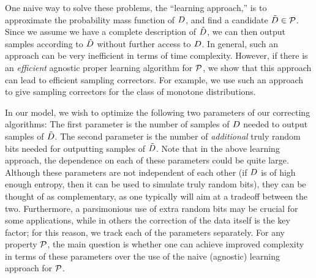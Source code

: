 One naive way to solve these problems, the ``learning approach,''
is to approximate the probability mass function of $D$, 
and find a candidate $\tilde{D} \in \mathcal{P}$.
Since we assume we have a complete description
of $\tilde{D}$, we can then output samples according to $\tilde{D}$ 
without further access to $D$.  
In general, such an approach can be very inefficient in terms of time complexity.
However, if there is 
an  \emph{efficient} agnostic proper learning algorithm\footnotemark{} for $\mathcal{P}$, 
we show that this approach can lead to efficient sampling correctors.
For example, we use such an approach to give sampling correctors
for the class of monotone distributions.
\smallskip
{}

In our model, we wish to optimize the following 
two parameters of our correcting algorithms:
The first parameter 
is the number of samples of $D$ needed to output samples of $\tilde{D}$. The
second parameter is
the number of  \emph{additional} truly random bits 
needed for outputting samples of $\tilde{D}$.
Note that in the above learning approach, the dependence on each
of these parameters could be quite large.
Although these parameters are not independent of each
other (if $D$ is of high enough entropy, then it can be used
to simulate truly random bits), they can be thought of as complementary, as one typically will aim at a tradeoff between the two. 
Furthermore, a parsimonious use of extra random bits may be crucial 
for some applications,
while in others the correction of the data itself is the key factor; 
for this reason, 
we track each of the parameters separately.
For any property $\mathcal{P}$, the main question is whether one
can achieve improved complexity  in terms of
these parameters over the use of the naive (agnostic) learning approach
for $\mathcal{P}$.



